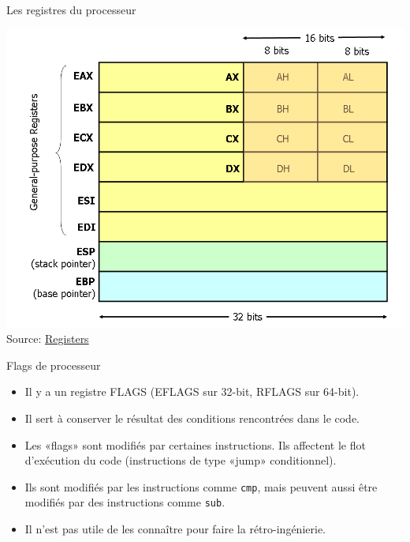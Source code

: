 \documentclass[10pt,xcolor={table,dvipsnames},t]{beamer}
\begin{document}
\begin{frame}{Les registres du processeur}

    \begin{center}
    \includegraphics[width=.60\textwidth,height=.60\textheight]{x86-registers}\newline{}
    Source: \href{http://blog.jpauli.tech/2016-11-30-on-c-performances-html/}{Registers}
    \end{center}
\end{frame}

\begin{frame}{Flags de processeur}
    \begin{itemize}
        \item Il y a un registre FLAGS (EFLAGS sur 32-bit, RFLAGS sur 64-bit). 
        \item Il sert à conserver le résultat des conditions rencontrées dans le code.
        \item Les «flags» sont modifiés par certaines instructions. Ils affectent le flot d'exécution du code (instructions de type «jump» conditionnel).
        \item Ils sont modifiés par les instructions comme \texttt{cmp}, mais peuvent aussi être modifiés par des instructions comme \texttt{sub}. 
        \item Il n'est pas utile de les connaître pour faire la rétro-ingénierie.
    \end{itemize}
\end{frame}
\end{document}
